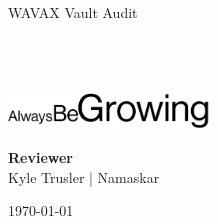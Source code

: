 \begin{titlepage}
  \vbox{}
  \vbox{}

  \begin{center}


    \noindent\makebox[\linewidth]{\rule{.7\paperwidth}{.6pt}}\\[0.7cm]

    { \huge \bfseries

      WAVAX Vault Audit
    }\\[0.25cm]
    
    \noindent\makebox[\linewidth]{\rule{.7\paperwidth}{.6pt}}\\[0.7cm]

    \vfill

    \includegraphics[width=0.40\textwidth]{img/abg_wordmark.png}

    
    \large
    {\bfseries Reviewer}\\
    
    Kyle Trusler | Namaskar

    {\large \today}

  \end{center}

\end{titlepage}